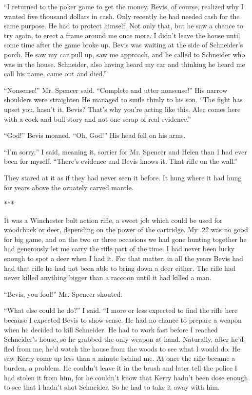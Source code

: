 \documentclass{novel}
\begin{document}
“I returned to the poker game to get the money. Bevis, of course, realized why I wanted five thousand dollars in cash. Only recently he had needed cash for the same purpose. He had to protect himself. Not only that, but he saw a chance to try again, to erect a frame around me once more. I didn’t leave the house until some time after the game broke up. Bevis was waiting at the side of Schneider’s porch. He saw my car pull up, saw me approach, and he called to Schneider who was in the house. Schneider, also having heard my car and thinking he heard me call his name, came out and died.”

“Nonsense!” Mr. Spencer said. “Complete and utter nonsense!” His narrow shoulders were straighten He managed to smile thinly to his son. “The fight has upset you, hasn’t it, Bevis? That’s why you’re acting like this. Alec comes here with a cock-and-bull story and not one scrap of real evidence.”

“God!” Bevis moaned. “Oh, God!” His head fell on his arms.

“I’m sorry,” I said, meaning it, sorrier for Mr. Spencer and Helen than I had ever been for myself. “There’s evidence and Bevis knows it. That rifle on the wall.”

They stared at it as if they had never seen it before. It hung where it had hung for years above the ornately carved mantle.

***

It was a Winchester bolt action rifle, a sweet job which could be used for woodchuck or deer, depending on the power of the cartridge. My .22 was no good for big game, and on the two or three occasions we had gone hunting together he had generously let me carry the rifle part of the time. I had never been lucky enough to spot a deer when I had it. For that matter, in all the years Bevis had had that rifle he had not been able to bring down a deer either. The rifle had never killed anything bigger than a raccoon until it had killed a man.

“Bevis, you fool!” Mr. Spencer shouted.

“What else could he do?” I said. “I more or less expected to find the rifle here because I expected Bevis to show sense. He had no chance to prepare a weapon when he decided to kill Schneider. He had to work fast before I reached Schneider’s house, so he grabbed the only weapon at hand. Naturally, after he’d fled from me, he’d watch the house from the woods to see what I would do. He saw Kerry come up less than a minute behind me. At once the rifle became a burden, a problem. He couldn’t leave it in the brush and later tell the police I had stolen it from him, for he couldn’t know that Kerry hadn’t been dose enough to see that I hadn’t shot Schneider. So he had to take it away with him.
\end{document}
